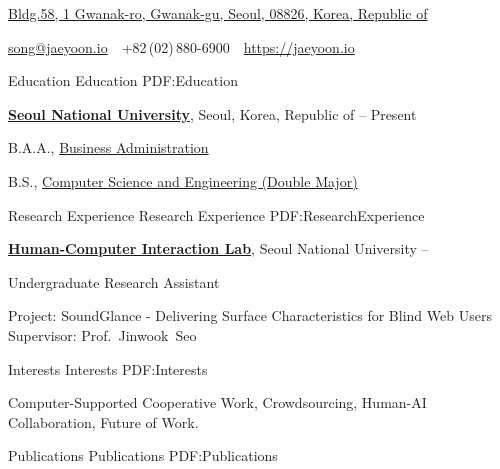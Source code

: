 \documentclass[letterpaper,MMMyyyy,nonstopmode]{simpleresumecv}
\newcommand{\CVAuthor}{Jaeyoon Song}
\newcommand{\CVWebpage}{https://jaeyoon.io}
\begin{document}

\Title{\CVAuthor}

\begin{SubTitle}
\href{https://www.google.com/maps/place/1+Gwanak-ro,+Daehak-dong,+Gwanak-gu,+Seoul,+South+Korea}
{Bldg.58, 1 Gwanak-ro, Gwanak-gu, Seoul, 08826, Korea, Republic of}
\par
\href{mailto:song@jaeyoon.io}
{song@jaeyoon.io}
\,\SubBulletSymbol\,
+82\,(02)\,880-6900
\,\SubBulletSymbol\,
\href{\CVWebpage}
{\url{\CVWebpage}}
\end{SubTitle}

\begin{Body}



\Section
{Education}
{Education}
{PDF:Education}

\Entry
\href{http://www.snu.ac.kr}
{\textbf{Seoul National University}},
Seoul, Korea, Republic of
\hfill
{} --
Present

\Gap
\BulletItem
B.A.A.,
\href{http://cba.snu.ac.kr}
{Business Administration}

\Gap
\BulletItem
B.S.,
\href{http://cse.snu.ac.kr}
{Computer Science and Engineering (Double Major)}

\BigGap
\Section
{Research Experience}
{Research Experience}
{PDF:ResearchExperience}

\Entry
\href{http://hcil.snu.ac.kr/}
{\textbf{Human-Computer Interaction Lab}},
Seoul National University
\hfill
{} --

\Gap
\BulletItem
Undergraduate Research Assistant
\begin{Detail}
\SubBulletItem
Project:
SoundGlance - Delivering Surface Characteristics for Blind Web Users
\SubBulletItem
Supervisor:
Prof.~Jinwook~Seo
\end{Detail}

    
\BigGap
\Section
{Interests}
{Interests}
{PDF:Interests}

\Entry
Computer-Supported Cooperative Work,
Crowdsourcing,
Human-AI Collaboration,
Future of Work.



\BigGap
\Section
{Publications}
{Publications}
{PDF:Publications}


\end{Body}
\end{document}
